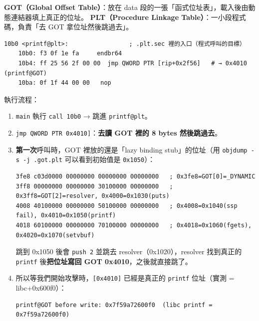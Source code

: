 \documentclass[10pt,a4paper]{article}
\begin{document}
\textbf{GOT（Global Offset Table）}：放在 data
段的一張「函式位址表」，載入後由動態連結器填上真正的位址。
\textbf{PLT（Procedure Linkage Table）}：一小段程式碼，負責「去 GOT
拿位址然後跳過去」。

\begin{Verbatim}[breaklines=true,breakanywhere=true,breakautoindent=false,fontsize=\fontsize{7.0}{9.5}\selectfont]
    10b0 <printf@plt>:                 ; .plt.sec 裡的入口（程式呼叫的目標）
    10b0: f3 0f 1e fa     endbr64
    10b4: ff 25 56 2f 00 00  jmp QWORD PTR [rip+0x2f56]   # → 0x4010 (printf@GOT)
    10ba: 0f 1f 44 00 00   nop
\end{Verbatim}

執行流程：

\begin{enumerate}
\def\labelenumi{\arabic{enumi}.}
\item
  \texttt{main} 執行 \texttt{call\ \allowbreak{}10b0} → 跳進 \texttt{printf@plt}。
\item
  \texttt{jmp\ \allowbreak{}QWORD\ \allowbreak{}PTR\ \allowbreak{}{[}0x4010{]}}：\textbf{去讀 GOT 裡的 8 bytes
  然後跳過去}。
\item
  \textbf{第一次}呼叫時，GOT 裡放的還是「lazy binding stub」的位址（用
  \texttt{objdump\ \allowbreak{}-\allowbreak{}s\ \allowbreak{}-\allowbreak{}j\ \allowbreak{}.\allowbreak{}got.\allowbreak{}plt} 可以看到初始值是
  \texttt{0x1050}）：

\begin{Verbatim}[breaklines=true,breakanywhere=true,breakautoindent=false,fontsize=\fontsize{7.0}{9.5}\selectfont]
3fe8 c03d0000 00000000 00000000 00000000   ; 0x3fe8=GOT[0]=_DYNAMIC
3ff8 00000000 00000000 30100000 00000000   ; 0x3ff8=GOT[2]=resolver, 0x4000=0x1030(puts)
4008 40100000 00000000 50100000 00000000   ; 0x4008=0x1040(ssp fail), 0x4010=0x1050(printf)
4018 60100000 00000000 70100000 00000000   ; 0x4018=0x1060(fgets),   0x4020=0x1070(setvbuf)
\end{Verbatim}

  跳到 0x1050 後會 \texttt{push\ \allowbreak{}2} 並跳去 resolver（0x1020），resolver
  找到真正的 \texttt{printf} 後\textbf{把位址寫回 GOT
  0x4010}，之後就直接跳了。
\item
  所以等我們開始攻擊時，\texttt{{[}0x4010{]}} 已經是真正的
  \texttt{printf} 位址（實測 = libc+0x600f0）：

\begin{Verbatim}[breaklines=true,breakanywhere=true,breakautoindent=false,fontsize=\fontsize{7.0}{9.5}\selectfont]
printf@GOT before write: 0x7f59a72600f0  (libc printf = 0x7f59a72600f0)
\end{Verbatim}
\end{enumerate}
\end{document}
